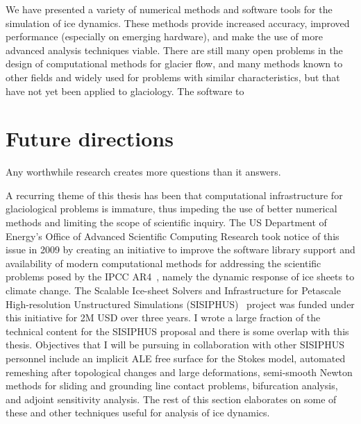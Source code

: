 We have presented a variety of numerical methods and software tools for the simulation of ice dynamics.
These methods provide increased accuracy, improved performance (especially on emerging hardware), and make the use of more advanced analysis techniques viable.
There are still many open problems in the design of computational methods for glacier flow, and many methods known to other fields and widely used for problems with similar characteristics, but that have not yet been applied to glaciology.
The software to


\section{Future directions}
Any worthwhile research creates more questions than it answers.

A recurring theme of this thesis has been that computational infrastructure for glaciological problems is immature, thus impeding the use of better numerical methods and limiting the scope of scientific inquiry.
The US Department of Energy's Office of Advanced Scientific Computing Research took notice of this issue in 2009 by creating an initiative to improve the software library support and availability of modern computational methods for addressing the scientific problems posed by the IPCC AR4~\citep{lemk2007ar4wg1}, namely the dynamic response of ice sheets to climate change.
The Scalable Ice-sheet Solvers and Infrastructure for Petascale High-resolution Unstructured Simulations (SISIPHUS)~\citep*{sisiphus-web} project was funded under this initiative for 2M USD over three years.
I wrote a large fraction of the technical content for the SISIPHUS proposal and there is some overlap with this thesis.
Objectives that I will be pursuing in collaboration with other SISIPHUS personnel include an implicit ALE free surface for the Stokes model, automated remeshing after topological changes and large deformations, semi-smooth Newton methods for sliding and grounding line contact problems, bifurcation analysis, and adjoint sensitivity analysis.
The rest of this section elaborates on some of these and other techniques useful for analysis of ice dynamics.

